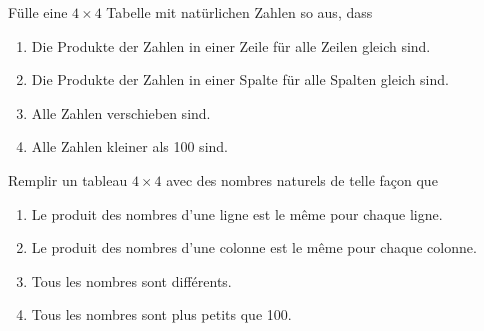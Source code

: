 Fülle eine $4\times 4$ Tabelle mit natürlichen Zahlen so aus, dass
\begin{enumerate}
\item Die Produkte der Zahlen in einer Zeile für alle Zeilen gleich sind.
\item Die Produkte der Zahlen in einer Spalte für alle Spalten gleich sind.
\item Alle Zahlen verschieben sind.
\item Alle Zahlen kleiner als 100 sind.
\end{enumerate}

\bigskip

Remplir un tableau $4 \times 4$ avec des nombres naturels de telle façon que
\begin{enumerate}
\item Le produit des nombres d'une ligne est le même pour chaque ligne.
\item Le produit des nombres d'une colonne est le même pour chaque colonne.
\item Tous les nombres sont différents.
\item Tous les nombres sont plus petits que 100.
\end{enumerate}